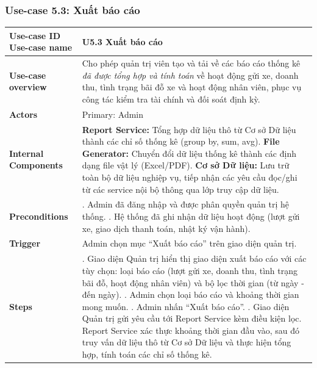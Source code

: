 \subsubsection{Use-case 5.3: Xuất báo cáo}
\vspace{0.5cm}
\noindent
{\small
\renewcommand{\arraystretch}{0.95}
\begin{longtable}{|>{\raggedright\arraybackslash}p{4cm}|>{\raggedright\arraybackslash}p{11.5cm}|}
\hline
\textbf{Use-case ID} \newline \textbf{Use-case name} & U5.3 \newline \textbf{Xuất báo cáo} \\ \hline
\endhead
\textbf{Use-case overview} & Cho phép quản trị viên tạo và tải về các báo cáo thống kê \textit{đã được tổng hợp và tính toán} về hoạt động gửi xe, doanh thu, tình trạng bãi đỗ xe và hoạt động nhân viên, phục vụ công tác kiểm tra tài chính và đối soát định kỳ. \\ \hline
\textbf{Actors} & Primary: Admin \\ \hline
\textbf{Internal Components} &
\textbf{Report Service:} Tổng hợp dữ liệu thô từ Cơ sở Dữ liệu thành các chỉ số thống kê (group by, sum, avg). \newline
\textbf{File Generator:} Chuyển đổi dữ liệu thống kê thành các định dạng file vật lý (Excel/PDF). \newline
\textbf{Cơ sở Dữ liệu:} Lưu trữ toàn bộ dữ liệu nghiệp vụ, tiếp nhận các yêu cầu đọc/ghi từ các service nội bộ thông qua lớp truy cập dữ liệu. \\ \hline
\textbf{Preconditions} &
1. Admin đã đăng nhập và được phân quyền quản trị hệ thống. \newline
2. Hệ thống đã ghi nhận dữ liệu hoạt động (lượt gửi xe, giao dịch thanh toán, nhật ký vận hành). \\ \hline
\textbf{Trigger} & Admin chọn mục ``Xuất báo cáo'' trên giao diện quản trị. \\ \hline
\textbf{Steps} &
1. Giao diện Quản trị hiển thị giao diện xuất báo cáo với các tùy chọn: loại báo cáo (lượt gửi xe, doanh thu, tình trạng bãi đỗ, hoạt động nhân viên) và bộ lọc thời gian (từ ngày - đến ngày). \newline
2. Admin chọn loại báo cáo và khoảng thời gian mong muốn. \newline
3. Admin nhấn ``Xuất báo cáo''. \newline
4. Giao diện Quản trị gửi yêu cầu tới Report Service kèm điều kiện lọc. Report Service xác thực khoảng thời gian đầu vào, sau đó truy vấn dữ liệu thô từ Cơ sở Dữ liệu và thực hiện tổng hợp, tính toán các chỉ số thống kê. \newline

\end{longtable}}
